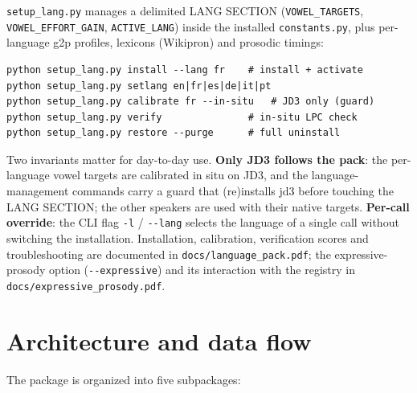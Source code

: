 \documentclass[11pt,a4paper]{article}
\begin{document}
\texttt{setup\_lang.py} manages a delimited LANG SECTION
(\texttt{VOWEL\_TARGETS}, \texttt{VOWEL\_EFFORT\_GAIN},
\texttt{ACTIVE\_LANG}) inside the installed \texttt{constants.py},
plus per-language g2p profiles, lexicons (Wikipron) and prosodic
timings:

\begin{lstlisting}[style=shell]
python setup_lang.py install --lang fr    # install + activate
python setup_lang.py setlang en|fr|es|de|it|pt
python setup_lang.py calibrate fr --in-situ   # JD3 only (guard)
python setup_lang.py verify               # in-situ LPC check
python setup_lang.py restore --purge      # full uninstall
\end{lstlisting}

Two invariants matter for day-to-day use. \textbf{Only JD3 follows
the pack}: the per-language vowel targets are calibrated in situ on
JD3, and the language-management commands carry a guard that
(re)installs jd3 before touching the LANG SECTION; the other speakers
are used with their native targets. \textbf{Per-call override}: the
CLI flag \texttt{-l} / \texttt{-{}-lang} selects the language of a
single call without switching the installation. Installation,
calibration, verification scores and troubleshooting are documented
in \texttt{docs/language\_pack.pdf}; the expressive-prosody option
(\texttt{-{}-expressive}) and its interaction with the registry in
\texttt{docs/expressive\_prosody.pdf}.

\section{Architecture and data flow}\label{sec:architecture}

The package is organized into five subpackages:
\end{document}
